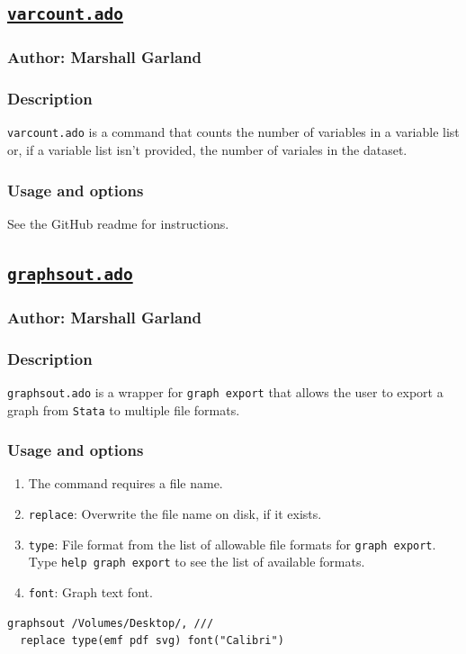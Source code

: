{\subsection{\href{https://github.com/marshallwg/varcount}{\texttt{varcount.ado}}}
\subsubsection{Author: Marshall Garland}
\subsubsection{Description}
\texttt{varcount.ado} is a command that counts the number of variables in a variable list or, if a variable list isn't provided, the number of variales in the dataset.
\subsubsection{Usage and options}
See the GitHub readme for instructions.

\subsection{\href{https://github.com/GibsonConsult/graphsout}{\texttt{graphsout.ado}}}
\subsubsection{Author: Marshall Garland}
\subsubsection{Description}
\texttt{graphsout.ado} is a wrapper for \texttt{graph export} that allows the user to export a graph from \texttt{Stata} to multiple file formats.
\subsubsection{Usage and options}
\begin{enumerate}
\item The command requires a file name.
\item \texttt{replace}: Overwrite the file name on disk, if it exists.
\item \texttt{type}: File format from the list of allowable file formats for \texttt{graph export}. Type \texttt{help graph export} to see the list of available formats.
\item \texttt{font}: Graph text font.
\end{enumerate}
\begin{lstlisting}
graphsout /Volumes/Desktop/, ///
  replace type(emf pdf svg) font("Calibri")
\end{lstlisting}

}
